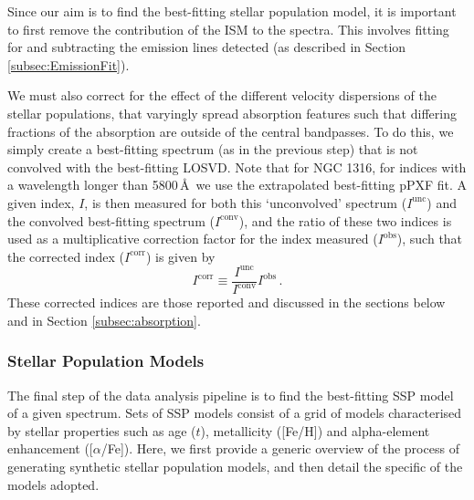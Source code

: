 			Since our aim is to find the best-fitting stellar population model, it is important to first remove the contribution of the ISM to the spectra. This involves fitting for and subtracting the emission lines detected (as described in Section \ref{subsec:EmissionFit}). 

			We must also correct for the effect of the different velocity dispersions of the stellar populations, that varyingly spread absorption features such that differing fractions of the absorption are outside of the central bandpasses. To do this, we simply create a best-fitting spectrum (as in the previous step) that is not convolved with the best-fitting LOSVD. Note that for NGC 1316, for indices with a wavelength longer than 5800\,\AA\, we use the extrapolated best-fitting pPXF fit. A given index, $I$, is then measured for both this `unconvolved' spectrum ($I^\text{unc}$) and the convolved best-fitting spectrum ($I^\text{conv}$), and the ratio of these two indices is used as a multiplicative correction factor for the index measured ($I^\text{obs}$), such that the corrected index ($I^\text{corr}$) is given by
			\begin{equation}
				I^\text{corr} \equiv \frac{I^\text{unc}}{I^\text{conv}} I^\text{obs} \, .
			\end{equation}
			These corrected indices are those reported and discussed in the sections below and in Section \ref{subsec:absorption}.


		\subsubsection{Stellar Population Models}
			\label{subsubsec:StellarPop}
			The final step of the data analysis pipeline is to find the best-fitting SSP model of a given spectrum. Sets of SSP models consist of a grid of models characterised by stellar properties such as age ($t$), metallicity ([Fe/H]) and alpha-element enhancement ([$\alpha$/Fe]). Here, we first provide a generic overview of the process of generating synthetic stellar population models, and then detail the specific of the models adopted. 

